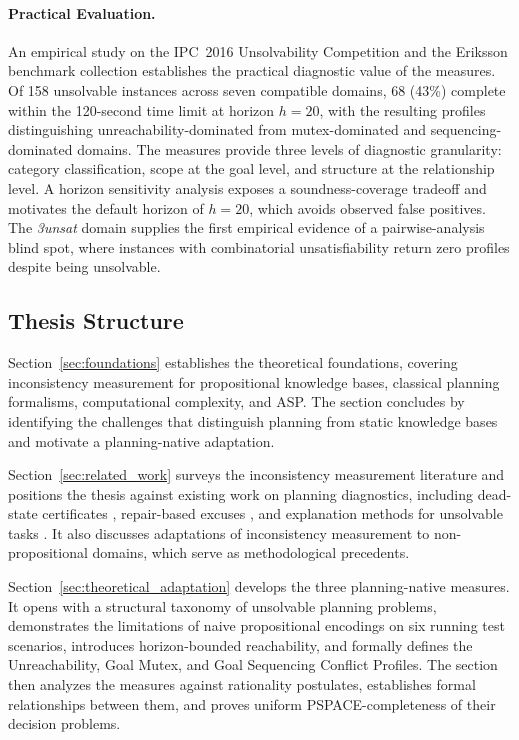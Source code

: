 \paragraph{Practical Evaluation.}
An empirical study on the \ac{IPC}~2016 Unsolvability Competition and the Eriksson benchmark collection establishes the practical diagnostic value of the measures. Of 158 unsolvable instances across seven compatible domains, 68 (43\%) complete within the 120-second time limit at horizon $h = 20$, with the resulting profiles distinguishing unreachability-dominated from mutex-dominated and sequencing-dominated domains. The measures provide three levels of diagnostic granularity: category classification, scope at the goal level, and structure at the relationship level. A horizon sensitivity analysis exposes a soundness-coverage tradeoff and motivates the default horizon of $h = 20$, which avoids observed false positives. The \textit{3unsat} domain supplies the first empirical evidence of a pairwise-analysis blind spot, where instances with combinatorial unsatisfiability return zero profiles despite being unsolvable.

\subsection{Thesis Structure}
\label{sec:thesis_structure}

Section~\ref{sec:foundations} establishes the theoretical foundations, covering inconsistency measurement for propositional knowledge bases, classical planning formalisms, computational complexity, and \ac{ASP}. The section concludes by identifying the challenges that distinguish planning from static knowledge bases and motivate a planning-native adaptation.

Section~\ref{sec:related_work} surveys the inconsistency measurement literature and positions the thesis against existing work on planning diagnostics, including dead-state certificates \cite{Eriksson2018}, repair-based excuses \cite{Goebelbecker2010}, and explanation methods for unsolvable tasks \cite{Sreedharan2019}. It also discusses adaptations of inconsistency measurement to non-propositional domains, which serve as methodological precedents.

Section~\ref{sec:theoretical_adaptation} develops the three planning-native measures. It opens with a structural taxonomy of unsolvable planning problems, demonstrates the limitations of naive propositional encodings on six running test scenarios, introduces horizon-bounded reachability, and formally defines the Unreachability, Goal Mutex, and Goal Sequencing Conflict Profiles. The section then analyzes the measures against rationality postulates, establishes formal relationships between them, and proves uniform PSPACE-completeness of their decision problems.

